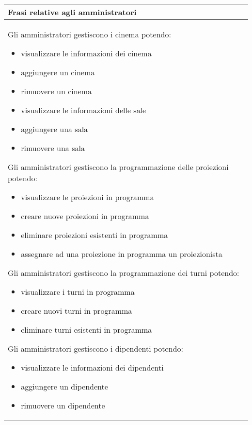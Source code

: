 \begin{tabularx}{\linewidth}{|X|}
      \hline
      \rowcolor{tblhdrcolor}
      \textbf{Frasi relative agli amministratori} \\\hline

      Gli amministratori gestiscono i cinema potendo:
      \begin{itemize}
            \item visualizzare le informazioni dei cinema
            \item aggiungere un cinema
            \item rimuovere un cinema
            \item visualizzare le informazioni delle sale
            \item aggiungere una sala
            \item rimuovere una sala
      \end{itemize}

      Gli amministratori gestiscono la programmazione delle proiezioni
      potendo:
      \begin{itemize}
            \item visualizzare le proiezioni in programma
            \item creare nuove proiezioni in programma
            \item eliminare proiezioni esistenti in programma
            \item assegnare ad una proiezione in programma un proiezionista
      \end{itemize}

      Gli amministratori gestiscono la programmazione dei turni
      potendo:
      \begin{itemize}
            \item visualizzare i turni in programma
            \item creare nuovi turni in programma
            \item eliminare turni esistenti in programma
      \end{itemize}

      Gli amministratori gestiscono i dipendenti potendo:
      \begin{itemize}
            \item visualizzare le informazioni dei dipendenti
            \item aggiungere un dipendente
            \item rimuovere un dipendente
      \end{itemize}


\end{tabularx}
